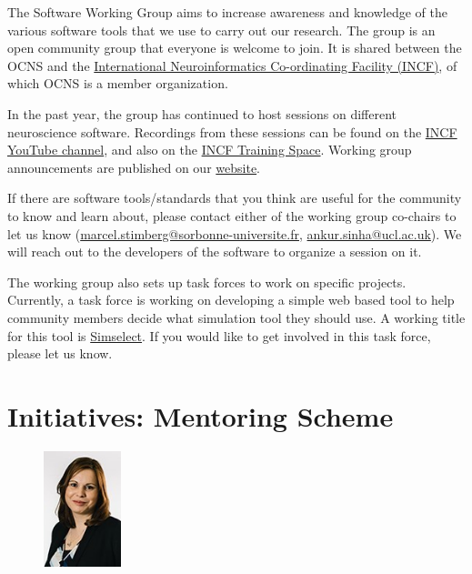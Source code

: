 \documentclass[11pt,a4paper,oneside]{article}
\begin{document}
The Software Working Group aims to increase awareness and knowledge of the various software tools that we use to carry out our research.
The group is an open community group that everyone is welcome to join.
It is shared between the OCNS and the \href{https://incf.org}{International Neuroinformatics Co-ordinating Facility (INCF)}, of which OCNS is a member organization.

In the past year, the group has continued to host sessions on different neuroscience software.
Recordings from these sessions can be found on the \href{https://www.youtube.com/@IncfOrg_INCF/videos}{INCF YouTube channel}, and also on the \href{https://training.incf.org/course/incfocns-working-group-computational-neuroscience-software}{INCF Training Space}.
Working group announcements are published on our \href{https://ocns.github.io/SoftwareWG/}{website}.

If there are software tools/standards that you think are useful for the community to know and learn about, please contact either of the working group co-chairs to let us know (\href{mailto:marcel.stimberg@sorbonne-universite.fr}{marcel.stimberg@sorbonne-universite.fr}, \href{mailto:ankur.sinha@ucl.ac.uk}{ankur.sinha@ucl.ac.uk}).
We will reach out to the developers of the software to organize a session on it.

The working group also sets up task forces to work on specific projects.
Currently, a task force is working on developing a simple web based tool to help community members decide what simulation tool they should use.
A working title for this tool is \href{https://github.com/OCNS/simselect/issues}{Simselect}. 
If you would like to get involved in this task force, please let us know.

\section*{Initiatives: Mentoring Scheme}%
\begin{figure}
  \includegraphics[width=0.2\textwidth]{images/Mavritsaki}
\end{figure}
\end{document}
